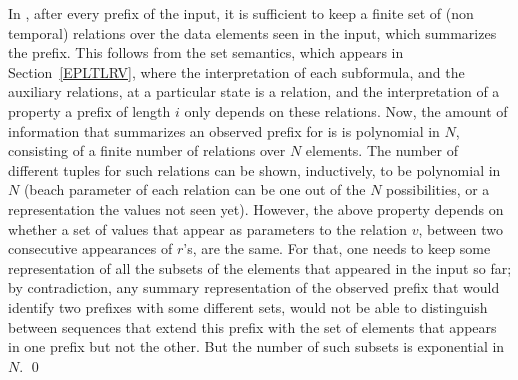 \documentclass{llncs}
\begin{document}
In \EPFLTL{}, after every prefix of the input, it is
sufficient to keep a finite set of (non temporal) relations over the
data elements seen in the input, which
summarizes the prefix. This follows from the set
semantics, which appears in Section~\ref{EPLTLRV}, 
where the interpretation of
each subformula, and the auxiliary relations,
at a particular state is a relation, and the interpretation 
of a property a prefix of length $i$ only depends on
these relations. Now, the amount of information
that summarizes an observed prefix for
\EPFLTL{} is is polynomial
in $N$, consisting of a finite number
of relations over
$N$ elements. The number of different tuples
for such relations can be shown, inductively, to
be polynomial in $N$ (beach parameter
of each relation can be one out of the $N$ possibilities, or a representation the values not seen yet).
However, the above property depends on whether
a set of values that appear as parameters to
the relation $v$, between two consecutive appearances
of $r$'s, are the same. For that, one needs to keep some representation of all the
subsets of the elements that appeared in the input so far; by contradiction, any summary representation of the observed prefix that
would identify two prefixes with some different sets, would not be able to distinguish between
sequences that extend this prefix with the set
of elements that appears in one prefix but not the other.
But the number of such subsets is exponential in $N$. \qed
\fi


\iffalse
{\bf Comments.} First, note that the reason that \QFLTL{} {\em can} express the property in Theorem~\ref{theo2}, is that it allows to augment the input relations with auxiliary relations that are not fixed. That is, for an auxiliary relation $R$,
$R [ i ]$ is not fixed, and can change per different
prefixes (of length at least $i$), or even in different
subformulas. Second, given a simple extension to \EFLTL{}, where 
one can use a variable that represents an updatable
counter (or a generator of distinct values), one can express the property used in~\ref{theo2}, by
keeping a relation where values between different occurrences of the event $r$ are paired with distinct values, hence, representing an unbounded set of sets.
\fi

\end{document}
